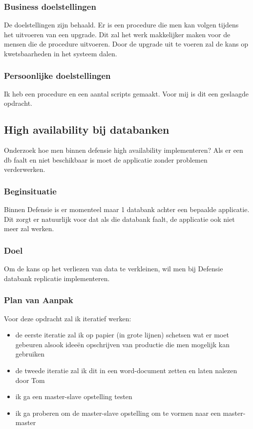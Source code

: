 \subsubsection{Business doelstellingen}

De doelstellingen zijn behaald. Er is een procedure die men kan volgen tijdens het uitvoeren van een upgrade. Dit zal het werk makkelijker maken voor de mensen die de procedure uitvoeren. Door de upgrade uit te voeren zal de kans op kwetsbaarheden in het systeem dalen.

\subsubsection{Persoonlijke doelstellingen}

Ik heb een procedure en een aantal scripts gemaakt. Voor mij is dit een geslaagde opdracht.

\pagebreak

\subsection{High availability bij databanken}


Onderzoek hoe men binnen defensie high availability implementeren? Als er een db faalt en niet beschikbaar is moet de applicatie zonder problemen verderwerken.

\subsubsection{Beginsituatie}

Binnen Defensie is er momenteel maar 1 databank achter een bepaalde applicatie. Dit zorgt er natuurlijk voor dat als die databank faalt, de applicatie ook niet meer zal werken.

\subsubsection{Doel}

Om de kans op het verliezen van data te verkleinen, wil men bij Defensie databank replicatie implementeren.

\subsubsection{Plan van Aanpak}

Voor deze opdracht zal ik iteratief werken:

\begin{itemize}
    \item de eerste iteratie zal ik op papier (in grote lijnen) schetsen wat er moet gebeuren alsook ideeën opschrijven van productie die men mogelijk kan gebruiken
    \item de tweede iteratie zal ik dit in een word-document zetten en laten nalezen door Tom
    \item ik ga een master-slave opstelling testen
    \item ik ga proberen om de master-slave opstelling om te vormen naar een master-master
\end{itemize}

